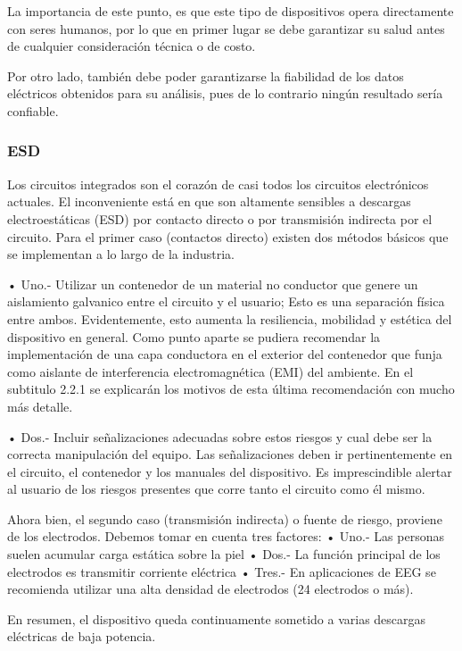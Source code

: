 \documentclass[11pt]{article}
\begin{document}
La importancia de este punto, es que este tipo de dispositivos opera directamente con seres humanos, por lo que en primer lugar se debe garantizar su salud antes de cualquier consideración técnica o de costo.

Por otro lado, también debe poder garantizarse la fiabilidad de los datos eléctricos obtenidos para su análisis, pues de lo contrario ningún resultado sería confiable.

\subsubsection{ESD}
\label{sec:org11f9cc0}
Los circuitos integrados son el corazón de casi todos los circuitos electrónicos actuales. El inconveniente está en que son altamente sensibles a descargas electroestáticas (ESD) por contacto directo o por transmisión indirecta por el circuito.
Para el primer caso (contactos directo) existen dos métodos básicos que se implementan a lo largo de la industria.

• Uno.- Utilizar un contenedor de un material no conductor que genere un aislamiento galvanico entre el circuito y el usuario; Esto es una separación física entre ambos. Evidentemente, esto aumenta la resiliencia, mobilidad y estética del dispositivo en general. Como punto aparte se pudiera recomendar la implementación de una capa conductora en el exterior del contenedor que funja como aislante de interferencia electromagnética (EMI) del ambiente. En el subtitulo 2.2.1 se explicarán los motivos de esta última recomendación con mucho más detalle.

• Dos.- Incluir señalizaciones adecuadas sobre estos riesgos y cual debe ser la correcta manipulación del equipo. Las señalizaciones deben ir pertinentemente en el circuito, el contenedor y los manuales del dispositivo. Es imprescindible alertar al usuario de los riesgos presentes que corre tanto el circuito como él mismo.

Ahora bien, el segundo caso (transmisión indirecta) o fuente de riesgo, proviene de los electrodos. Debemos tomar en cuenta tres factores:
• Uno.- Las personas suelen acumular carga estática sobre la piel
• Dos.- La función principal de los electrodos es transmitir corriente eléctrica
• Tres.- En aplicaciones de EEG se recomienda utilizar una alta densidad de electrodos (24 electrodos o más).

En resumen, el dispositivo queda continuamente sometido a varias descargas eléctricas de baja potencia.
\end{document}
